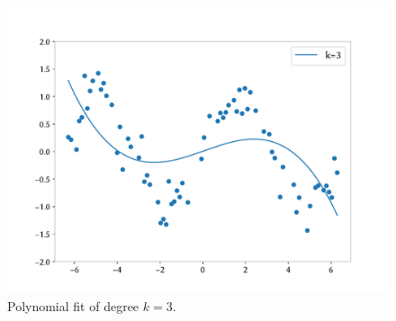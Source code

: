 \begin{answer}
    \begin{figure}[h]
        \centering
        \includegraphics*[width=.7\linewidth]{../src/featuremaps/part_b.pdf}
        \caption{Polynomial fit of degree $k=3$.}
        \end{figure}
\end{answer}
